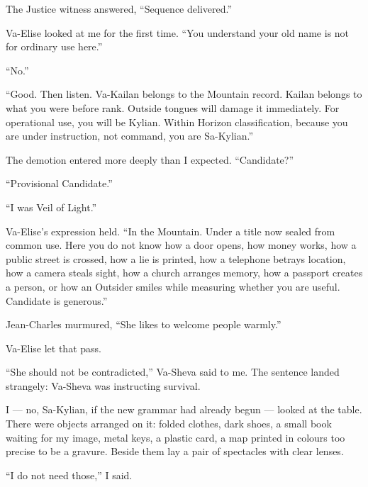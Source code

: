 The Justice witness answered, ``Sequence delivered.''\par

Va-Elise looked at me for the first time. ``You understand your old name is not for ordinary use here.''\par

``No.''\par

``Good. Then listen. Va-Kailan belongs to the Mountain record. Kailan belongs to what you were before rank. Outside tongues will damage it immediately. For operational use, you will be Kylian. Within Horizon classification, because you are under instruction, not command, you are Sa-Kylian.''\par

The demotion entered more deeply than I expected. ``Candidate?''\par

``Provisional Candidate.''\par

``I was Veil of Light.''\par

Va-Elise's expression held. ``In the Mountain. Under a title now sealed from common use. Here you do not know how a door opens, how money works, how a public street is crossed, how a lie is printed, how a telephone betrays location, how a camera steals sight, how a church arranges memory, how a passport creates a person, or how an Outsider smiles while measuring whether you are useful. Candidate is generous.''\par

Jean-Charles murmured, ``She likes to welcome people warmly.''\par

Va-Elise let that pass.\par

``She should not be contradicted,'' Va-Sheva said to me. The sentence landed strangely: Va-Sheva was instructing survival.\par

I --- no, Sa-Kylian, if the new grammar had already begun --- looked at the table. There were objects arranged on it: folded clothes, dark shoes, a small book waiting for my image, metal keys, a plastic card, a map printed in colours too precise to be a gravure. Beside them lay a pair of spectacles with clear lenses.\par

``I do not need those,'' I said.\par

